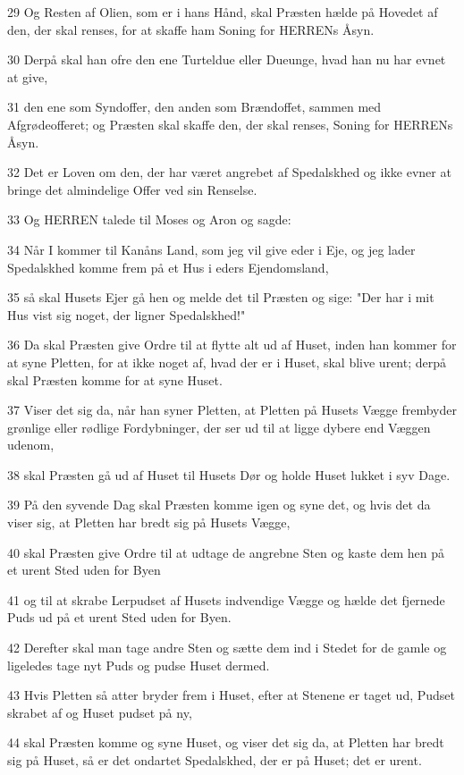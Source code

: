 \par 29 Og Resten af Olien, som er i hans Hånd, skal Præsten hælde på Hovedet af den, der skal renses, for at skaffe ham Soning for HERRENs Åsyn.
\par 30 Derpå skal han ofre den ene Turteldue eller Dueunge, hvad han nu har evnet at give,
\par 31 den ene som Syndoffer, den anden som Brændoffet, sammen med Afgrødeofferet; og Præsten skal skaffe den, der skal renses, Soning for HERRENs Åsyn.
\par 32 Det er Loven om den, der har været angrebet af Spedalskhed og ikke evner at bringe det almindelige Offer ved sin Renselse.
\par 33 Og HERREN talede til Moses og Aron og sagde:
\par 34 Når I kommer til Kanåns Land, som jeg vil give eder i Eje, og jeg lader Spedalskhed komme frem på et Hus i eders Ejendomsland,
\par 35 så skal Husets Ejer gå hen og melde det til Præsten og sige: "Der har i mit Hus vist sig noget, der ligner Spedalskhed!"
\par 36 Da skal Præsten give Ordre til at flytte alt ud af Huset, inden han kommer for at syne Pletten, for at ikke noget af, hvad der er i Huset, skal blive urent; derpå skal Præsten komme for at syne Huset.
\par 37 Viser det sig da, når han syner Pletten, at Pletten på Husets Vægge frembyder grønlige eller rødlige Fordybninger, der ser ud til at ligge dybere end Væggen udenom,
\par 38 skal Præsten gå ud af Huset til Husets Dør og holde Huset lukket i syv Dage.
\par 39 På den syvende Dag skal Præsten komme igen og syne det, og hvis det da viser sig, at Pletten har bredt sig på Husets Vægge,
\par 40 skal Præsten give Ordre til at udtage de angrebne Sten og kaste dem hen på et urent Sted uden for Byen
\par 41 og til at skrabe Lerpudset af Husets indvendige Vægge og hælde det fjernede Puds ud på et urent Sted uden for Byen.
\par 42 Derefter skal man tage andre Sten og sætte dem ind i Stedet for de gamle og ligeledes tage nyt Puds og pudse Huset dermed.
\par 43 Hvis Pletten så atter bryder frem i Huset, efter at Stenene er taget ud, Pudset skrabet af og Huset pudset på ny,
\par 44 skal Præsten komme og syne Huset, og viser det sig da, at Pletten har bredt sig på Huset, så er det ondartet Spedalskhed, der er på Huset; det er urent.
